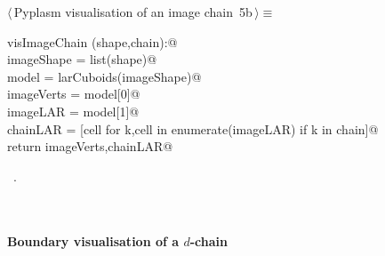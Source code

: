 \documentclass[11pt,oneside]{article}	%
\begin{document}
\begin{flushleft} \small
\begin{minipage}{\linewidth} \label{scrap8}
\protect{}$\langle\,$Pyplasm visualisation of an image chain\nobreak\ {\footnotesize 5b}$\,\rangle\equiv$
\vspace{-1ex}
\begin{list}{}{} \item
\mbox{}\verb@def visImageChain (shape,chain):@\\
\mbox{}\verb@   imageShape = list(shape)@\\
\mbox{}\verb@   model = larCuboids(imageShape)@\\
\mbox{}\verb@   imageVerts = model[0]@\\
\mbox{}\verb@   imageLAR = model[1]@\\
\mbox{}\verb@   chainLAR = [cell for k,cell in enumerate(imageLAR) if k in chain]@\\
\mbox{}\verb@   return imageVerts,chainLAR@\\
\mbox{}\verb@@{\NWsep}
\end{list}
\vspace{-1ex}
\footnotesize\addtolength{\baselineskip}{-1ex}
\begin{list}{}{\setlength{\itemsep}{-\parsep}\setlength{\itemindent}{-\leftmargin}}
\item \NWtxtMacroRefIn\ .
\end{list}
\end{minipage}\\[4ex]
\end{flushleft}

\paragraph{Boundary visualisation of a $d$-chain}
\end{document}
